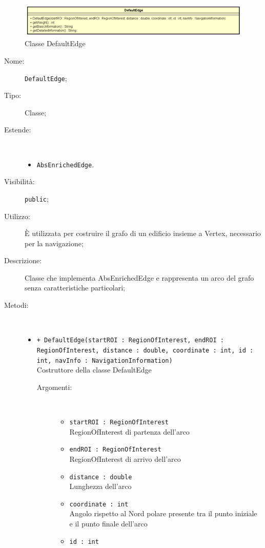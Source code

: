 \documentclass[../DefinizioneDiProdotto.tex]{subfiles}
\begin{document}
    \begin{figure}[H]
        \centering
        \includegraphics{img/DefaultEdge.png}
        \caption{Classe DefaultEdge}\label{fig:model::navigator::graph::edge::DefaultEdge} 
    \end{figure}
    \begin{description}
\item[Nome:] \texttt{DefaultEdge};
\item[Tipo:] Classe;
\item[Estende:] \
\begin{itemize}
\item \texttt{AbsEnrichedEdge}.
\end{itemize}
\item[Visibilità:] \texttt{public};
\item[Utilizzo:] È utilizzata per costruire il grafo di un edificio insieme a Vertex, necessario per la navigazione;
\item[Descrizione:] Classe che implementa AbsEnrichedEdge e rappresenta un arco del grafo senza caratteristiche particolari;
\item[Metodi:] \
\begin{itemize}
\item \texttt{+ DefaultEdge(startROI : RegionOfInterest, endROI : RegionOfInterest, distance : double, coordinate : int, id : int, navInfo : NavigationInformation)}\\
Costruttore della classe DefaultEdge
 \begin{description}
\item[Argomenti:] \
\begin{itemize}
\item \texttt{startROI : RegionOfInterest}\\
RegionOfInterest di partenza dell'arco\item \texttt{endROI : RegionOfInterest}\\
RegionOfInterest di arrivo dell'arco\item \texttt{distance : double}\\
Lunghezza dell'arco\item \texttt{coordinate : int}\\
Angolo rispetto al Nord polare presente tra il punto iniziale e il punto finale dell'arco\item \texttt{id : int}\\

\end{itemize}
\end{description}
\end{itemize}
\end{description}
\end{document}
